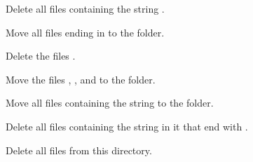 \begin{exercises}
  \item Delete all files containing the string .
  \item Move all files ending in  to the  folder.
  \item Delete the files  .
  \item Move the files , , and  to the  folder.
  \item Move all files containing the string  to the  folder.
  \item Delete all files containing the string  in it that end with .
  \item Delete all files from this directory.
\end{exercises}
